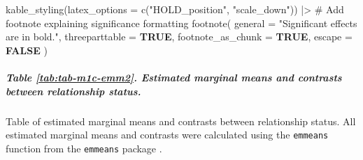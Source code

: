 \documentclass[
  bookmarksnumbered]{article}
\newenvironment{Shaded}{\begin{snugshade}}{\end{snugshade}}
\newcommand{\AttributeTok}[1]{\textcolor[rgb]{0.80,0.80,0.80}{#1}}
\newcommand{\CommentTok}[1]{\textcolor[rgb]{0.50,0.62,0.50}{#1}}
\newcommand{\ConstantTok}[1]{\textcolor[rgb]{0.86,0.64,0.64}{\textbf{#1}}}
\newcommand{\FunctionTok}[1]{\textcolor[rgb]{0.94,0.94,0.56}{#1}}
\newcommand{\NormalTok}[1]{\textcolor[rgb]{0.80,0.80,0.80}{#1}}
\newcommand{\SpecialCharTok}[1]{\textcolor[rgb]{0.86,0.64,0.64}{#1}}
\newcommand{\StringTok}[1]{\textcolor[rgb]{0.80,0.58,0.58}{#1}}
\begin{document}
\begin{Shaded}
\begin{Highlighting}[]
  \FunctionTok{kable\_styling}\NormalTok{(}\AttributeTok{latex\_options =} \FunctionTok{c}\NormalTok{(}\StringTok{"HOLD\_position"}\NormalTok{, }\StringTok{"scale\_down"}\NormalTok{)) }\SpecialCharTok{|\textgreater{}}
  \CommentTok{\# Add footnote explaining significance formatting}
  \FunctionTok{footnote}\NormalTok{(}
    \AttributeTok{general =} \StringTok{"Significant effects are in bold."}\NormalTok{, }\AttributeTok{threeparttable =} \ConstantTok{TRUE}\NormalTok{,}
    \AttributeTok{footnote\_as\_chunk =} \ConstantTok{TRUE}\NormalTok{, }\AttributeTok{escape =} \ConstantTok{FALSE}
\NormalTok{  )}
\end{Highlighting}
\end{Shaded}

\begin{table}[H]
\centering
\caption{\label{tab:tab-m1c-emm1}Estimated marginal means and contrasts between participants' gender}
\centering
{}
\end{table}

\subparagraph{Table \ref{tab:tab-m1c-emm2}. Estimated marginal means and contrasts between relationship status.}\label{table-reftabtab-m1c-emm2.-estimated-marginal-means-and-contrasts-between-relationship-status.}

Table of estimated marginal means and contrasts between relationship status. All estimated marginal means and contrasts were calculated using the \texttt{emmeans} function from the \texttt{emmeans} package \autocite{emmeanscit}.
\end{document}

